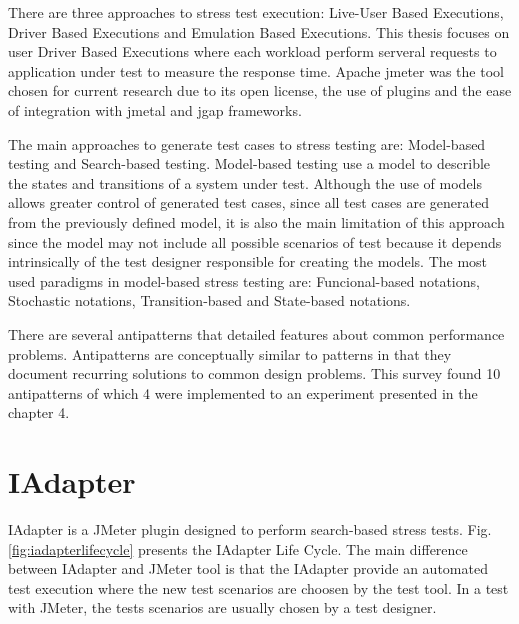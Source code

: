 \documentclass[espaco=umemeio,chapter=TITLE,twoside,openright]{abnt}
\begin{document}
There are three approaches to stress test execution: Live-User Based Executions, Driver Based Executions and Emulation Based Executions. This thesis focuses on user Driver Based Executions where each workload perform serveral requests to application under test to measure the response time. Apache jmeter was the tool chosen for current research due to its open license, the use of plugins and the ease of integration with jmetal and jgap frameworks.

The main approaches to generate test cases to stress testing are: Model-based testing and Search-based testing. Model-based testing use a model to describle the states and transitions of a system under test. Although the use of models allows greater control of generated test cases, since all test cases are generated from the previously defined model, it is also the main limitation of this approach since the model may not include all possible scenarios of test because it depends intrinsically of the test designer responsible for creating the models. The most used paradigms in model-based stress testing are:  Funcional-based notations, Stochastic notations, Transition-based and State-based notations. 

There are several antipatterns that detailed features about common performance problems. Antipatterns
are conceptually similar to patterns in that they document recurring solutions to common design problems. This survey found 10 antipatterns of which 4 were  implemented to an experiment presented in the chapter 4.



\chapter{IAdapter }



IAdapter is a JMeter plugin designed to perform search-based stress tests. Fig. \ref{fig:iadapterlifecycle} presents the IAdapter Life Cycle. The main difference between IAdapter and JMeter tool is that the IAdapter provide an automated test execution where the new test scenarios are choosen by the test tool.  In a test with JMeter, the tests scenarios are usually chosen by a test designer.
\end{document}
